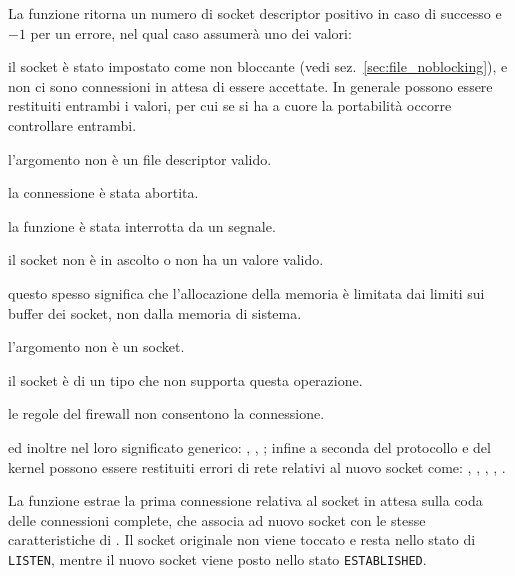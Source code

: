 \begin{funcproto}{
}

{La funzione ritorna un numero di socket descriptor positivo in caso di
  successo e $-1$ per un errore, nel qual caso  assumerà uno dei
  valori:
  \begin{errlist}
  \item[\errcode{EAGAIN} o \errcode{EWOULDBLOCK}] il socket è stato impostato
    come non bloccante (vedi sez.~\ref{sec:file_noblocking}), e non ci sono
    connessioni in attesa di essere accettate. In generale possono essere
    restituiti entrambi i valori, per cui se si ha a cuore la portabilità
    occorre controllare entrambi.
  \item[\errcode{EBADF}] l'argomento  non è un file descriptor
    valido.
  \item[\errcode{ECONNABORTED}] la connessione è stata abortita.
  \item[\errcode{EINTR}] la funzione è stata interrotta da un segnale.
  \item[\errcode{EINVAL}] il socket non è in ascolto o  non ha
    un valore valido. 
  \item[\errcode{ENOBUFS}, \errcode{ENOMEM}] questo spesso significa che
    l'allocazione della memoria è limitata dai limiti sui buffer dei socket,
    non dalla memoria di sistema.
  \item[\errcode{ENOTSOCK}] l'argomento  non è un socket.
  \item[\errcode{EOPNOTSUPP}] il socket è di un tipo che non supporta questa
    operazione.
  \item[\errcode{EPERM}] le regole del firewall non consentono la connessione.
  \end{errlist}
  ed inoltre nel loro significato generico: , ,
  ; infine a seconda del protocollo e del kernel possono essere
  restituiti errori di rete relativi al nuovo socket come: ,
  , , ,
  .}
\end{funcproto}

La funzione estrae la prima connessione relativa al socket  in
attesa sulla coda delle connessioni complete, che associa ad nuovo socket con
le stesse caratteristiche di .  Il socket originale non viene
toccato e resta nello stato di \texttt{LISTEN}, mentre il nuovo socket viene
posto nello stato \texttt{ESTABLISHED}. 

